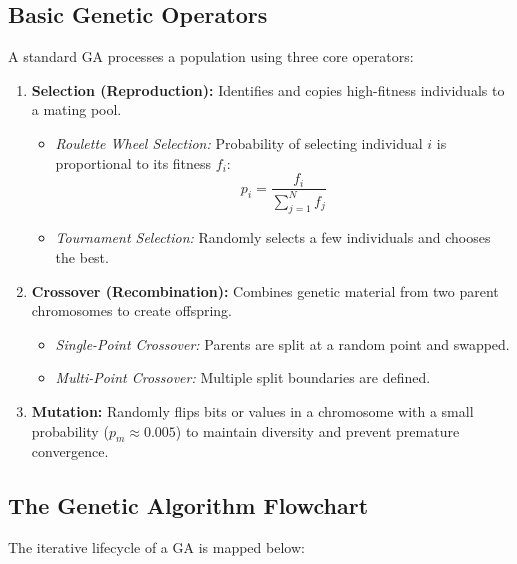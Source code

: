 \documentclass[12pt,a4paper]{article}
\begin{document}
\subsection{Basic Genetic Operators}
A standard GA processes a population using three core operators:
\begin{enumerate}[label=\textbf{\arabic*.}, leftmargin=*, itemsep=3.5pt]
  \item \textbf{Selection (Reproduction):} Identifies and copies high-fitness individuals to a mating pool.
    \begin{itemize}[label=\tiny$\bullet$, leftmargin=1.5em, itemsep=2pt]
      \item \textit{Roulette Wheel Selection:} Probability of selecting individual $i$ is proportional to its fitness $f_i$:
        \begin{equation}
          p_i = \frac{f_i}{\sum_{j=1}^N f_j}
        \end{equation}
      \item \textit{Tournament Selection:} Randomly selects a few individuals and chooses the best.
    \end{itemize}
  \item \textbf{Crossover (Recombination):} Combines genetic material from two parent chromosomes to create offspring.
    \begin{itemize}[label=\tiny$\bullet$, leftmargin=1.5em, itemsep=2pt]
      \item \textit{Single-Point Crossover:} Parents are split at a random point and swapped.
      \item \textit{Multi-Point Crossover:} Multiple split boundaries are defined.
    \end{itemize}
  \item \textbf{Mutation:} Randomly flips bits or values in a chromosome with a small probability ($p_m \approx 0.005$) to maintain diversity and prevent premature convergence.
\end{enumerate}

\subsection{The Genetic Algorithm Flowchart}
The iterative lifecycle of a GA is mapped below:
\end{document}
